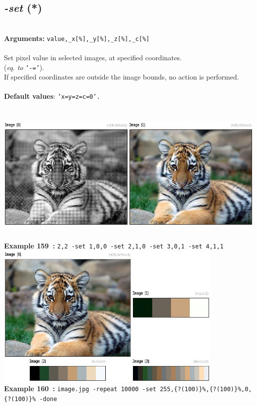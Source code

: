 \documentclass[a4paper,11pt,twoside]{book}
\begin{document}
\subsection{\emph{-set} (*)}\vspace*{-0.5em}
~\\\textbf{Arguments: } 
{\small \texttt{value,\_x[\%],\_y[\%],\_z[\%],\_c[\%]}}\\~\\
Set pixel value in selected images, at specified coordinates.
~\\(\emph{eq. to} {\small \texttt{'-='}}).
~\\If specified coordinates are outside the image bounds, no action is performed.
~\\~\\\textbf{Default values}: {\small \texttt{'x=y=z=c=0'.}}
\begin{center}\includegraphics[keepaspectratio=true,height=7cm,width=\textwidth]{img/gmic_def159.jpg}\\
{\footnotesize \textbf{Example 159~:} \texttt{2,2 -set 1,0,0 -set 2,1,0 -set 3,0,1 -set 4,1,1}}
\\\includegraphics[keepaspectratio=true,height=7cm,width=\textwidth]{img/gmic_def160.jpg}\\
{\footnotesize \textbf{Example 160~:} \texttt{image.jpg -repeat 10000 -set 255,\{?(100)\}\%,\{?(100)\}\%,0,\{?(100)\}\% -done}}
\end{center}
\end{document}
